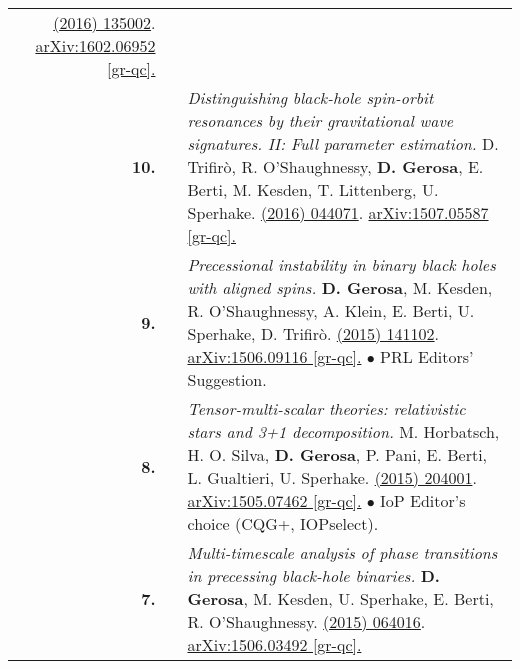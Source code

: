{\begin{longtable}{rp{0.3cm}p{15.8cm}}
\newline{}
\href{http://dx.doi.org/10.1088/0264-9381/33/13/135002}{\cqg 33 (2016) 135002}. \href{https://arxiv.org/abs/1602.06952}{arXiv:1602.06952 [gr-qc].}
\vspace{0.09cm}\\
%
\textbf{10.} & & \textit{Distinguishing black-hole spin-orbit resonances by their gravitational wave signatures. II: Full parameter estimation.}
\newline{}
D. Trifir\`o, R. O'Shaughnessy, \textbf{D. Gerosa}, E. Berti, M. Kesden, T. Littenberg, U. Sperhake.
\newline{}
\href{http://dx.doi.org/10.1103/PhysRevD.93.044071}{\prd 93 (2016) 044071}. \href{https://arxiv.org/abs/1507.05587}{arXiv:1507.05587 [gr-qc].}
\vspace{0.09cm}\\
%
\textbf{9.} & & \textit{Precessional instability in binary black holes with aligned spins.}
\newline{}
\textbf{D. Gerosa}, M. Kesden, R. O'Shaughnessy, A. Klein, E. Berti, U. Sperhake, D. Trifir\`o.
\newline{}
\href{http://dx.doi.org/10.1103/PhysRevLett.115.141102}{\prl 115 (2015) 141102}. \href{https://arxiv.org/abs/1506.09116}{arXiv:1506.09116 [gr-qc].}
\newline{}
\textcolor{color1}{$\bullet$} PRL Editors' Suggestion.
\vspace{0.09cm}\\
%
\textbf{8.} & & \textit{Tensor-multi-scalar theories: relativistic stars and 3+1 decomposition.}
\newline{}
M. Horbatsch, H. O. Silva, \textbf{D. Gerosa}, P. Pani,  E. Berti, L. Gualtieri, U. Sperhake.
\newline{}
\href{http://dx.doi.org/10.1088/0264-9381/32/20/204001}{\cqg 32 (2015) 204001}. \href{https://arxiv.org/abs/1505.07462}{arXiv:1505.07462 [gr-qc].}
\newline{}
\textcolor{color1}{$\bullet$} IoP Editor's choice (CQG+, IOPselect).
\vspace{0.09cm}\\
%
\textbf{7.} & & \textit{Multi-timescale analysis of phase transitions in precessing black-hole binaries.}
\newline{}
\textbf{D. Gerosa}, M. Kesden, U. Sperhake, E. Berti, R. O'Shaughnessy.
\newline{}
\href{http://dx.doi.org/10.1103/PhysRevD.92.064016}{\prd 92 (2015) 064016}. \href{https://arxiv.org/abs/1506.03492}{arXiv:1506.03492 [gr-qc].}

\end{longtable}}
